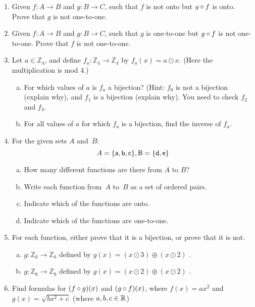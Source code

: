 \begin{enumerate}
\item
Given $f : A \rightarrow B$ and $g : B \rightarrow C$, such that $f$  is not onto but  $g \circ f$  is onto. Prove that $g$ is not one-to-one.

\item
Given $f : A \rightarrow B$ and $g : B \rightarrow C$, such that $g$  is one-to-one  but  $g \circ f$  is not one-to-one. Prove that $f$ is not one-to-one.

\item
Let $a \in \mathbb{Z}_4$, and define $f_a \colon \mathbb{Z}_4 \to \mathbb{Z}_4$ by $f_a(x) = a \odot x$.  (Here the multiplication is mod 4.) 
\begin{enumerate}[(a)]
\item \label{LinearWhenBijectionExer-not0}
For which values of $a$  is $f_a$ a bijection? (Hint: $f_0$ is not a bijection (explain why), and $f_1$ is a bijection (explain why).  You need to check $f_2$ and $f_3$.
\item \label{LinearWhenBijectionExer-0}
For all values of $a$ for which $f_a$ is a bijection, find the inverse of $f_a$.
\end{enumerate}

\item
 For the given sets $A$ and~$B$:
\[ A = \{\sf{a},\sf{b},\sf{c}\}, B = \{\sf{d},\sf{e}\} \]
\begin{enumerate}[(a)] 
\item How many different functions are there from $A$ to $B$?
\item Write each function from~$A$ to~$B$ as a set of ordered pairs. 
\item  Indicate which of the functions are onto.
\item Indicate which of the functions are one-to-one.
\end{enumerate}

\item
For each function, either prove that it is a bijection, or prove that it is not.
\begin{enumerate}[(a)]
\item \label{modular9}
 $g \colon {\mathbb Z}_6 \to {\mathbb Z}_6$ defined by $g(x)= (x \odot 3) \oplus  (x \odot 2)$ .
\item \label{modular_m6}
 $g \colon {\mathbb Z}_6 \to {\mathbb Z}_6$ defined by $g(x) = (x \odot 2) \oplus (x \odot 2) $ .
 \end{enumerate}

\item
Find formulas for $(f \circ g)(x)$ and $(g \circ f)(x)$, where 
 $f(x) = ax^2 $ and $g(x) = \sqrt{b x^2 + c}$ (where $a,b,c \in \mathbb{R}$)


\end{enumerate}
